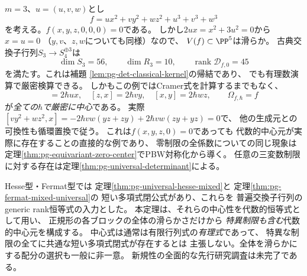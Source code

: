 \begin{example}[三変数制限が恒等的零でも中心元を得る]
\label{ex:pg-det-zero-ternary}
$m=3$、$u=(u,v,w)$とし
\begin{equation}
 f=u x^2+v y^2+w z^2+u^3+v^3+w^3
 \label{eq:pg-det-zero-ternary-example}
\end{equation}
を考える。$f(x,y,z,0,0,0)=0$である。
しかし$2ux=x^2+3u^2=0$から$x=u=0$
（$y,v$、$z,w$についても同様）なので、
$V(f)\subset\PP^5$は滑らか。
古典交換子行列$S_3\to S_4^{\oplus3}$は
\begin{equation}
 \dim S_3=56,\qquad
 \dim R_3=10,\qquad
 \operatorname{rank}\mathcal D_{f,0}=45
 \label{eq:pg-det-zero-ternary-rank}
\end{equation}
を満たす。これは補題
\ref{lem:pg-det-classical-kernel}の帰結であり、
でも有理数演算で厳密検算できる。
しかもこの例ではCramer式を計算するまでもなく、
\begin{equation}
 [y,z]=2\hbar ux,\quad
 [z,x]=2\hbar vy,\quad
 [x,y]=2\hbar wz,
 \qquad
 \Omega_{f,\hbar}=f
 \label{eq:pg-det-zero-ternary-explicit}
\end{equation}
が\emph{全ての$\hbar$で厳密に中心}である。
実際
$[vy^2+wz^2,x]
=-2\hbar vw(yz+zy)+2\hbar vw(zy+yz)=0$で、
他の生成元との可換性も循環置換で従う。
これは$f(x,y,z,0)=0$であっても
代数的中心元が実際に存在することの直接的な例であり、
零制限の全係数についての同じ現象は
定理\ref{thm:pg-equivariant-zero-center}でPBW対称化から導く。
任意の三変数制限に対する存在は定理\ref{thm:pg-universal-determinant}による。
\end{example}

\begin{remark}[先行研究と確実性]
\label{rem:pg-det-scope}
Hesse型・Fermat型では
定理\ref{thm:pg-universal-hesse-mixed}と
定理\ref{thm:pg-fermat-mixed-universal}の
短い多項式閉公式があり、これらを
普遍交換子行列のgeneric rank恒等式の入力とした。
本定理は、それらの中心性を代数的恒等式として用い、
正規形の各ブロックの全体の滑らかさだけから
\emph{特異制限も含む}代数的中心元を構成する。
中心式は通常は有限行列式の\emph{有理式}であって、
特異な制限の全てに共通な短い多項式閉式が存在するとは
主張しない。全体を滑らかにする配分の選択も一般に非一意。
新規性の全面的な先行研究調査は未完了である。
\end{remark}
